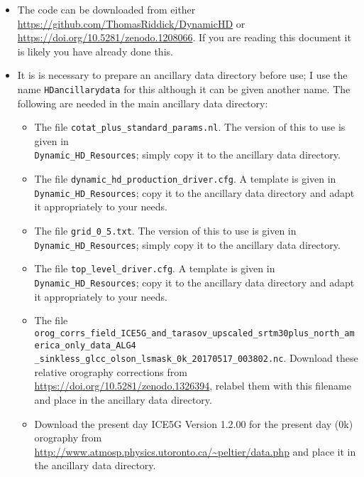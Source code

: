 \documentclass{article}
\begin{document}
\begin{itemize}
\item The code can be downloaded from either \url{https://github.com/ThomasRiddick/DynamicHD} or \url{https://doi.org/10.5281/zenodo.1208066}. If you are reading this document it is likely you have already done this.
\item It is is necessary to prepare an ancillary data directory before use; I use the name \lstinline[style=bash_input]{HDancillarydata} for this although it can be given another name. The following are needed in the main ancillary data directory:
\begin{itemize}
\item The file \lstinline[style=bash_input]{cotat_plus_standard_params.nl}. The version of this to use is given in \\\lstinline[style=bash_input]{Dynamic_HD_Resources}; simply copy it to the ancillary data directory.
\item The file \lstinline[style=bash_input]{dynamic_hd_production_driver.cfg}. A template is given in \lstinline[style=bash_input]{Dynamic_HD_Resources}; copy it to the ancillary data directory and adapt it appropriately to your needs.
\item  The file \lstinline[style=bash_input]{grid_0_5.txt}. The version of this to use is given in \lstinline[style=bash_input]{Dynamic_HD_Resources}; simply copy it to the ancillary data directory.
\item The file  \lstinline[style=bash_input]{top_level_driver.cfg}. A template is given in \lstinline[style=bash_input]{Dynamic_HD_Resources}; copy it to the ancillary data directory and adapt it appropriately to your needs.
\item The file \lstinline[style=bash_input]{orog_corrs_field_ICE5G_and_tarasov_upscaled_srtm30plus_north_america_only_data_ALG4} \\\lstinline[style=bash_input]{_sinkless_glcc_olson_lsmask_0k_20170517_003802.nc}. Download these relative orography corrections from \url{ https://doi.org/10.5281/zenodo.1326394}, relabel them with this filename and place in the ancillary data directory.
\item Download the present day ICE5G Version 1.2.00 for the present day (0k) orography from \url{http://www.atmosp.physics.utoronto.ca/~peltier/data.php} and place it in the ancillary data directory.
\end{itemize}

\end{itemize}
\end{document}
